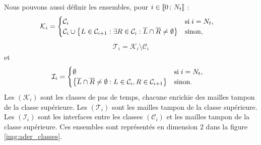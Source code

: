 Nous pouvons aussi définir les ensembles, pour $i \in \lbrack\!\lbrack0\,;\,N_t\rbrack\!\rbrack$ :
\begin{equation}
	\begin{aligned}
		\mathcal{K}_i &= \begin{cases}
			\mathcal{C}_i & \mathrm{si} \; i = N_t , \\
			\mathcal{C}_i \cup 
			\left\lbrace L \in \mathcal{C}_{i+1} : 
			\exists R \in \mathcal{C}_i :
			\overline{L} \cap \overline{R} \neq \emptyset
			\right\rbrace & \mathrm{sinon} ,
		\end{cases} 
	\end{aligned}
\end{equation}
\begin{align} \label{eq:lts2_tampon}
	\mathcal{T}_i = \mathcal{K}_i \setminus \mathcal{C}_i
\end{align}
et
\begin{align} \label{eq:lts2_interfaces}
	\mathcal{I}_i &= \begin{cases}
		\emptyset & \mathrm{si} \; i = N_t , \\
		\left\lbrace
			\overline{L} \cap \overline{R} \neq \emptyset :
			L \in \mathcal{C}_i ,
			R \in \mathcal{C}_{i+1}
		\right\rbrace & \mathrm{sinon} .
	\end{cases} 
\end{align}
Les $(\mathcal{K}_i)$ sont les classes de pas de temps,
chacune enrichie des mailles tampon de la classe supérieure.
Les $(\mathcal{T}_i)$ sont les mailles tampon de la classe supérieure.
Les $(\mathcal{I}_i)$ sont les interfaces entre les classes $(\mathcal{C}_i)$
et les mailles tampon de la classe supérieure.
Ces ensembles sont représentés en dimension $2$ dans la figure \ref{img:ader_classes}.



